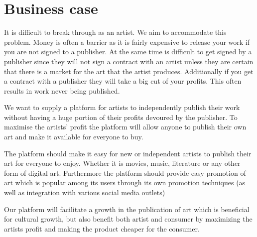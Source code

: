 \documentclass[../report.tex]{subfiles}
\begin{document}
\section{Business case}

It is difficult to break through as an artist. We aim to accommodate this problem. Money is often a barrier as it is fairly expensive to release your work if you are not signed to a publisher. At the same time is difficult to get signed by a publisher since they will not sign a contract with an artist unless they are certain that there is a market for the art that the artist produces. Additionally if you get a contract with a publisher they will take a big cut of your profits. This often results in work never being published. 

We want to supply a platform for artists to independently publish their work without having a huge portion of their profits devoured by the publisher. To maximise the artists' profit the platform will allow anyone to publish their own art and make it available for everyone to buy.

The platform should make it easy for new or independent artists to publish their art for everyone to enjoy. Whether it is movies, music, literature or any other form of digital art. Furthermore the platform should provide easy promotion of art which is popular among its users through its own promotion techniques (as well as integration with various social media outlets)

Our platform will facilitate a growth in the publication of art which is beneficial for cultural growth, but also benefit both artist and consumer by maximizing the artists profit and making the product cheaper for the consumer. 
\end{document}
